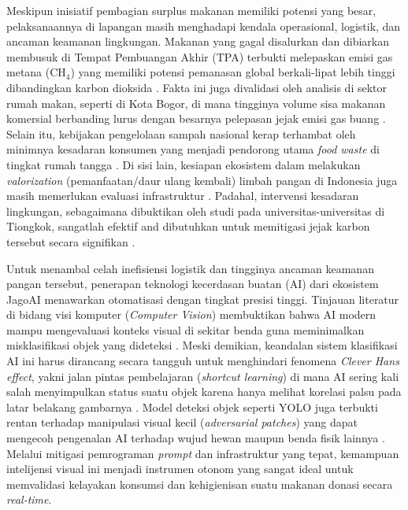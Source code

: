 Meskipun inisiatif pembagian surplus makanan memiliki potensi yang besar, pelaksanaannya di lapangan masih menghadapi kendala operasional, logistik, dan ancaman keamanan lingkungan. Makanan yang gagal disalurkan dan dibiarkan membusuk di Tempat Pembuangan Akhir (TPA) terbukti melepaskan emisi gas metana (CH$_4$) yang memiliki potensi pemanasan global berkali-lipat lebih tinggi dibandingkan karbon dioksida \cite{alliffiyaalkhansyaharsyDampakLimbahMakanan2025c}. Fakta ini juga divalidasi oleh analisis di sektor rumah makan, seperti di Kota Bogor, di mana tingginya volume sisa makanan komersial berbanding lurus dengan besarnya pelepasan jejak emisi gas buang \cite{fernandezCarbonFootprintAnalysis2024c}. Selain itu, kebijakan pengelolaan sampah nasional kerap terhambat oleh minimnya kesadaran konsumen yang menjadi pendorong utama \textit{food waste} di tingkat rumah tangga \cite{lestariKebijakanPengelolaanSampah2022c}. Di sisi lain, kesiapan ekosistem dalam melakukan \textit{valorization} (pemanfaatan/daur ulang kembali) limbah pangan di Indonesia juga masih memerlukan evaluasi infrastruktur \cite{immawanFoodWasteIndonesia2024a}. Padahal, intervensi kesadaran lingkungan, sebagaimana dibuktikan oleh studi pada universitas-universitas di Tiongkok, sangatlah efektif and dibutuhkan untuk memitigasi jejak karbon tersebut secara signifikan \cite{qianFoodWasteAssociated2022a}.

Untuk menambal celah inefisiensi logistik dan tingginya ancaman keamanan pangan tersebut, penerapan teknologi kecerdasan buatan (AI) dari ekosistem JagoAI menawarkan otomatisasi dengan tingkat presisi tinggi. Tinjauan literatur di bidang visi komputer (\textit{Computer Vision}) membuktikan bahwa AI modern mampu mengevaluasi konteks visual di sekitar benda guna meminimalkan misklasifikasi objek yang dideteksi \cite{jamaliContextObjectDetection2025b}. Meski demikian, keandalan sistem klasifikasi AI ini harus dirancang secara tangguh untuk menghindari fenomena \textit{Clever Hans effect}, yakni jalan pintas pembelajaran (\textit{shortcut learning}) di mana AI sering kali salah menyimpulkan status suatu objek karena hanya melihat korelasi palsu pada latar belakang gambarnya \cite{pathakUnmaskingCleverHans2026a}. Model deteksi objek seperti YOLO juga terbukti rentan terhadap manipulasi visual kecil (\textit{adversarial patches}) yang dapat mengecoh pengenalan AI terhadap wujud hewan maupun benda fisik lainnya \cite{hopsonStudyAIObject2026b}. Melalui mitigasi pemrograman \textit{prompt} dan infrastruktur yang tepat, kemampuan intelijensi visual ini menjadi instrumen otonom yang sangat ideal untuk memvalidasi kelayakan konsumsi dan kehigienisan suatu makanan donasi secara \textit{real-time}.

